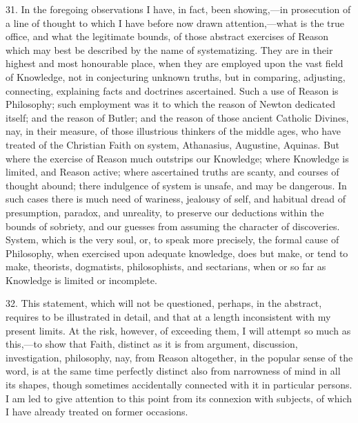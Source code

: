 31. In the foregoing observations I have, in fact, been showing,—in
prosecution of a line of thought to which I have before now drawn
attention,—what is the true office, and what the legitimate bounds,
of those abstract exercises of Reason which may best be described by
the name of systematizing. They are in their highest and most
honourable place, when they are employed upon the vast field of
Knowledge, not in conjecturing unknown truths, but in comparing,
adjusting, connecting, explaining facts and doctrines ascertained.
Such a use of Reason is Philosophy; such employment was it to which
the reason of Newton dedicated itself; and the reason of Butler; and
the reason of those ancient Catholic Divines, nay, in their measure,
of those illustrious thinkers of the middle ages, who have treated of
the Christian Faith on system, Athanasius, Augustine, Aquinas. But
where the exercise of Reason much outstrips our Knowledge; where
Knowledge is limited, and Reason active; where ascertained truths are
scanty, and courses of thought abound; there indulgence of system is
unsafe, and may be dangerous. In such cases there is much need of
wariness, jealousy of self, and habitual dread of presumption,
paradox, and unreality, to preserve our deductions within the bounds
of sobriety, and our guesses from assuming the character of
discoveries. System, which is the very soul, or, to speak more
precisely, the formal cause of Philosophy, when exercised upon
adequate knowledge, does but make, or tend to make, theorists,
dogmatists, philosophists, and sectarians, when or so far as Knowledge
is limited or incomplete.

32. This statement, which will not be questioned, perhaps, in the
abstract, requires to be illustrated in detail, and that at a length
inconsistent with my present limits. At the risk, however, of
exceeding them, I will attempt so much as this,—to show that Faith,
distinct as it is from argument, discussion, investigation,
philosophy, nay, from Reason altogether, in the popular sense of the
word, is at the same time perfectly distinct also from narrowness of
mind in all its shapes, though sometimes accidentally connected with
it in particular persons. I am led to give attention to this point
from its connexion with subjects, of which I have already treated on
former occasions.

